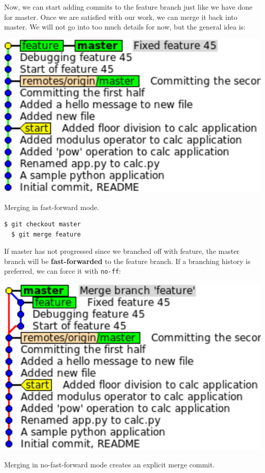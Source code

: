 \documentclass{../common/tufte-latex/tufte-handout}
\begin{document}
Now, we can start adding commits to the feature branch just like we have done for master.
Once we are satisfied with our work, we can merge it back into master.
We will not go into too much details for now, but the general idea is:

\begin{marginfigure}%
  \centering
  \includegraphics[width=\linewidth]{gitmerge-ff.pdf}
  \label{fig:gitmerge-ff}
  \caption{Merging in fast-forward mode.}
\end{marginfigure}

\begin{lstlisting}[style=BashInputStyle]
  $ git checkout master
  $ git merge feature
\end{lstlisting}

If master has not progressed since we branched off with feature, the master branch will be \textbf{fast-forwarded} to the feature branch.
If a branching history is preferred, we can force it with \texttt{no-ff}:

\begin{marginfigure}%
  \centering
  \includegraphics[width=\linewidth]{gitmerge-noff.pdf}
  \label{fig:gitmerge-noff}
  \caption{Merging in no-fast-forward mode creates an explicit merge commit.}
\end{marginfigure}
\end{document}
